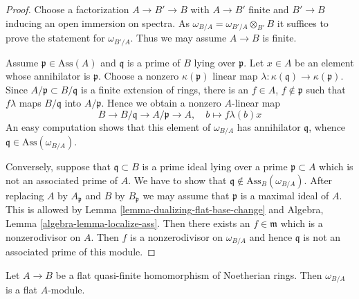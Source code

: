 \begin{proof}
Choose a factorization $A \to B' \to B$ with $A \to B'$ finite and
$B' \to B$ inducing an open immersion on spectra. As
$\omega_{B/A} = \omega_{B'/A} \otimes_{B'} B$ it suffices
to prove the statement for $\omega_{B'/A}$. Thus we may assume $A \to B$
is finite.

\medskip\noindent
Assume $\mathfrak p \in \text{Ass}(A)$ and $\mathfrak q$ is a prime
of $B$ lying over $\mathfrak p$. Let $x \in A$ be an element whose
annihilator is $\mathfrak p$. Choose a nonzero $\kappa(\mathfrak p)$
linear map $\lambda : \kappa(\mathfrak q) \to \kappa(\mathfrak p)$.
Since $A/\mathfrak p \subset B/\mathfrak q$ is a finite extension
of rings, there is an $f \in A$, $f \not \in \mathfrak p$
such that $f\lambda$ maps $B/\mathfrak q$ into $A/\mathfrak p$.
Hence we obtain a nonzero $A$-linear map
$$
B \to B/\mathfrak q \to A/\mathfrak p \to A,\quad
b \mapsto f\lambda(b)x
$$
An easy computation shows that this element of $\omega_{B/A}$
has annihilator $\mathfrak q$, whence
$\mathfrak q \in \text{Ass}(\omega_{B/A})$.

\medskip\noindent
Conversely, suppose that $\mathfrak q \subset B$ is a prime ideal
lying over a prime $\mathfrak p \subset A$ which is not an associated
prime of $A$. We have to show that
$\mathfrak q \not \in \text{Ass}_B(\omega_{B/A})$.
After replacing $A$ by $A_\mathfrak p$ and $B$ by
$B_\mathfrak p$ we may assume that $\mathfrak p$ is a maximal ideal
of $A$. This is allowed by Lemma \ref{lemma-dualizing-flat-base-change} and
Algebra, Lemma \ref{algebra-lemma-localize-ass}.
Then there exists an $f \in \mathfrak m$
which is a nonzerodivisor on $A$.
Then $f$ is a nonzerodivisor on $\omega_{B/A}$
and hence $\mathfrak q$ is not an associated prime of this module.
\end{proof}

\begin{lemma}
\label{lemma-dualizing-base-flat-flat}
Let $A \to B$ be a flat quasi-finite homomorphism of Noetherian rings.
Then $\omega_{B/A}$ is a flat $A$-module.
\end{lemma}

